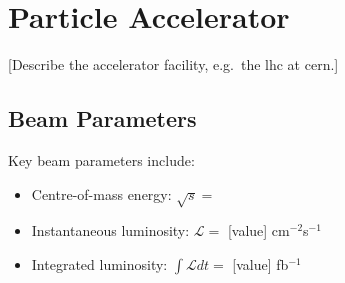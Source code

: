 \section{Particle Accelerator}
\label{sec:EXPERIMENT_PARTICLE_ACCELERATOR}

[Describe the accelerator facility, e.g.\ the \gls{lhc} at \gls{cern}.]

\subsection{Beam Parameters}
\label{sec:EXPERIMENT_PARTICLE_ACCELERATOR_BEAM_PARAMETERS}

Key beam parameters include:
\begin{itemize}
  \item Centre-of-mass energy: $\sqrt{s} = $ \fomLHCEnergy
  \item Instantaneous luminosity: $\mathcal{L} = $ [value] cm$^{-2}$s$^{-1}$
  \item Integrated luminosity: $\int \mathcal{L} dt = $ [value] fb$^{-1}$
\end{itemize}

